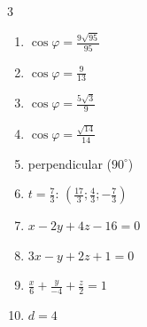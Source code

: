 \begin{multicols}{3}\raggedright
\begin{enumerate}[label=\arabic*., leftmargin=*, itemsep=1pt]
\item $\cos\varphi=\frac{9 \sqrt{95}}{95}$
\item $\cos\varphi=\frac{9}{13}$
\item $\cos\varphi=\frac{5 \sqrt{3}}{9}$
\item $\cos\varphi=\frac{\sqrt{14}}{14}$
\item perpendicular ($90^\circ$)
\item $t=\frac{7}{3}$: $\left(\frac{17}{3};\frac43;-\frac73\right)$
\item $x-2y+4z-16=0$
\item $3x-y+2z+1=0$
\item $\frac{x}{6}+\frac{y}{-4}+\frac{z}{2}=1$
\item $d=4$
\end{enumerate}
\end{multicols}
